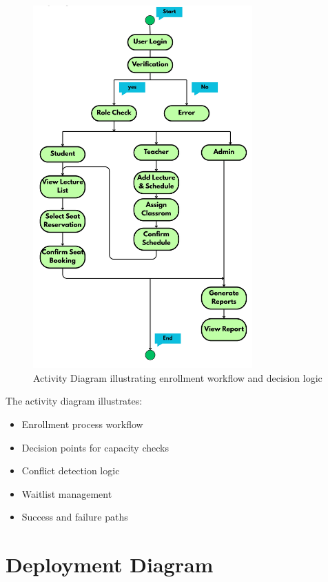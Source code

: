 \begin{figure}[h]
    \centering
    \includegraphics[width=0.75\textwidth]{images/Activity Diagram.jpg}
    \caption{Activity Diagram illustrating enrollment workflow and decision logic}
    \label{fig:activity}
\end{figure}

The activity diagram illustrates:
\begin{itemize}[leftmargin=*]
    \item Enrollment process workflow
    \item Decision points for capacity checks
    \item Conflict detection logic
    \item Waitlist management
    \item Success and failure paths
\end{itemize}

\section{Deployment Diagram}

